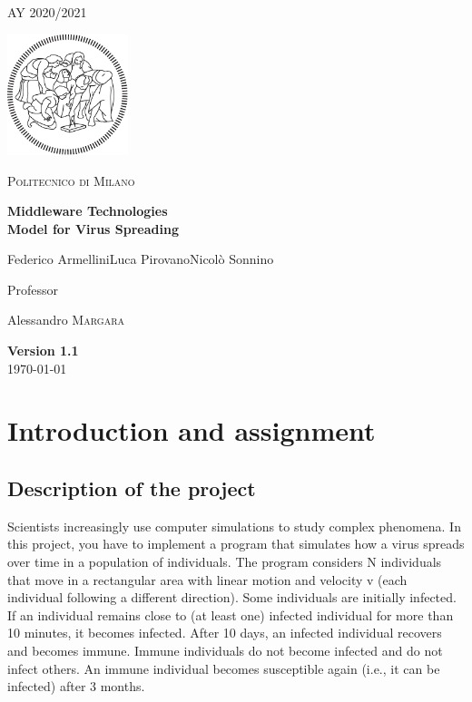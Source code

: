 \documentclass[table, 12pt]{article}
\begin{document}
	\begin{titlepage}
		\centering
		{\scshape\large AY 2020/2021 \par}
		\vfill
		\includegraphics[width=100pt]{assets/logo-polimi-new}\par\vspace{1cm}
		{\scshape\LARGE Politecnico di Milano \par}
		\vspace{1.5cm}
		{\huge\bfseries Middleware Technologies\\Model for Virus Spreading\par}
		\vspace{2cm}
		{\Large {Federico Armellini\quad Luca Pirovano\quad Nicolò Sonnino}\par}
		\vfill
		{\large Professor\par
			Alessandro \textsc{Margara}}
		\vfill
		{\large \textbf{Version 1.1}\\ \today \par}
	\end{titlepage}
	\thispagestyle{plain}
	\mbox{}
	\newpage
	\tableofcontents
	\newpage
	
	
\section{Introduction and assignment}
\subsection{Description of the project}
Scientists increasingly use computer simulations to study complex phenomena. In this project, you have to
implement a program that simulates how a virus spreads over time in a population of individuals. The program
considers N individuals that move in a rectangular area with linear motion and velocity v (each individual
following a different direction). Some individuals are initially infected. If an individual remains close to (at least
one) infected individual for more than 10 minutes, it becomes infected. After 10 days, an infected individual
recovers and becomes immune. Immune individuals do not become infected and do not infect others. An
immune individual becomes susceptible again (i.e., it can be infected) after 3 months.
\end{document}
